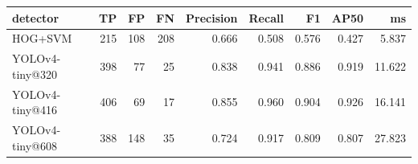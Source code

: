 \begin{tabular}{lrrrrrrrr}
\toprule
detector & TP & FP & FN & Precision & Recall & F1 & AP50 & ms \\
\midrule
HOG+SVM & 215 & 108 & 208 & 0.666 & 0.508 & 0.576 & 0.427 & 5.837 \\
YOLOv4-tiny@320 & 398 & 77 & 25 & 0.838 & 0.941 & 0.886 & 0.919 & 11.622 \\
YOLOv4-tiny@416 & 406 & 69 & 17 & 0.855 & 0.960 & 0.904 & 0.926 & 16.141 \\
YOLOv4-tiny@608 & 388 & 148 & 35 & 0.724 & 0.917 & 0.809 & 0.807 & 27.823 \\
\bottomrule
\end{tabular}
